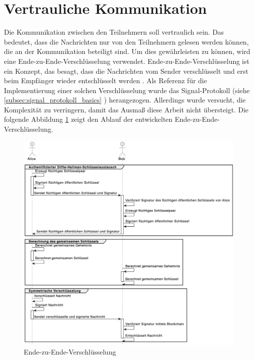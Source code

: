 \section{Vertrauliche Kommunikation}
\label{subsec:vertrauliche_kommunikation}

Die Kommunikation zwischen den Teilnehmern soll vertraulich sein. Das bedeutet, dass die Nachrichten nur von den Teilnehmern gelesen werden können, die an der Kommunikation beteiligt sind. Um dies gewährleisten zu können, wird eine Ende-zu-Ende-Verschlüsselung verwendet. Ende-zu-Ende-Verschlüsselung ist ein Konzept, das besagt, dass die Nachrichten vom Sender verschlüsselt und erst beim Empfänger wieder entschlüsselt werden \parencite[S. 233-260]{Wong_KryptoPraxis}. Als Referenz für die Implementierung einer solchen Verschlüsselung wurde das Signal-Protokoll (siehe \ref{subsec:signal_protokoll_basics} \textit{}) herangezogen. Allerdings wurde versucht, die Komplexität zu verringern, damit das Ausmaß diese Arbeit nicht übersteigt. Die folgende Abbildung \ref{fig:ende_zu_ende} zeigt den Ablauf der entwickelten Ende-zu-Ende-Verschlüsselung.


\begin{figure}[H]
    \centering
    \includegraphics[width=1\linewidth]{images/sec.jpg}
    \caption{Ende-zu-Ende-Verschlüsselung}
    \label{fig:ende_zu_ende}
\end{figure}

